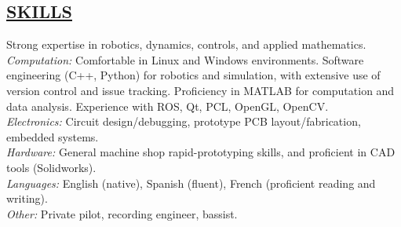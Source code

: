 \documentclass[line,margin]{res}
\newcommand{\CVOnly}[1]{}
\newcommand{\CVOnly}[1]{#1}
\begin{document}
\begin{resume}
\section{\underline{SKILLS}}
\vspace{1.0pc}Strong expertise in robotics, dynamics, controls, and applied mathematics.
\\[0.25pc] {\sl Computation: }
Comfortable in Linux and Windows environments.
Software engineering (C++, Python) for robotics and simulation, with extensive use of version control and issue tracking.
Proficiency in MATLAB for computation and data analysis.
Experience with ROS, Qt, PCL, OpenGL, OpenCV.
\\[0.25pc]{\sl Electronics: } Circuit design/debugging, prototype PCB layout/fabrication, embedded systems.
\\[0.25pc]{\sl Hardware: } General machine shop rapid-prototyping skills, and proficient in CAD tools (Solidworks).
\\[0.25pc]{\sl Languages: } English (native), Spanish (fluent), French (proficient reading and writing).
\\[0.25 		pc]{\sl Other: } Private pilot, recording engineer, bassist.
%
%
\CVOnly{
\section{\underline{AWARDS}}
\vspace{1.0pc}
          2007-2012 National Science Foundation Graduate Research Fellowship
\CVOnly{\\[0.0pc]2007 Stanford Graduate Fellowship }
\CVOnly{\\[0.0pc]2007 John McCamey Award presented by ISA}
\ResumeOnly{\\[0.0pc] Member of Tau Beta Pi and Phi Kappa Phi Honor Societies}
\CVOnly{
\\[0.0pc] Member, Tau Beta Pi Engineering Honor Society
\\[0.0pc] Member, Sigma Pi Sigma Physics Honor Society
\\[0.0pc] Member, Phi Kappa Phi Honor Society
\\[0.0pc] Member, Mortar Board National College Senior Honor Society
}
}
%
\CVOnly{
\section{\underline{REFERENCES}}
\vspace{1.0pc}
Dr. Kenneth Salisbury, Prof. Computer Science, 650.465.5700, jks@robotics.stanford.edu
\\[0.0pc]Dr. Paul Mitiguy, Prof. Mechanical Engineering, 650.346.9595,  mitiguy@stanford.edu
\\[0.0pc]Dr. Kaijen Hsiao, Bosch Research and Technology Center, 617.304.1759, kaijenhsiao@gmail.com
}
%
\end{resume}
\end{document}
